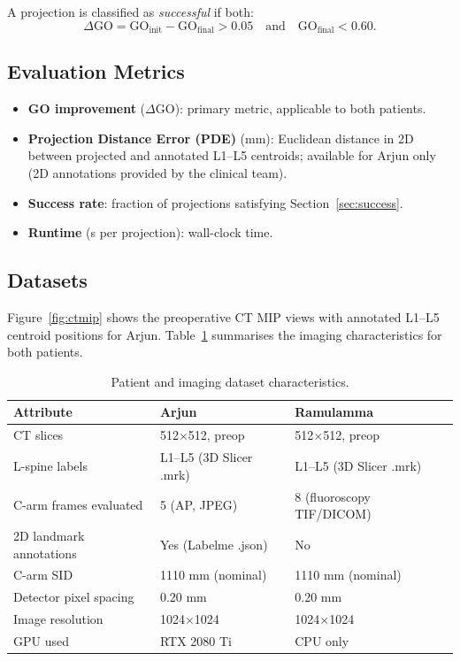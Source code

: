 \documentclass[10pt,a4paper]{article}
\begin{document}
A projection is classified as \emph{successful} if both:
\[
  \Delta\mathrm{GO} = \mathrm{GO}_\mathrm{init} -
                      \mathrm{GO}_\mathrm{final} > 0.05
  \quad \text{and} \quad
  \mathrm{GO}_\mathrm{final} < 0.60.
\]

\subsection{Evaluation Metrics}
\label{sec:metrics}

\begin{itemize}
  \item \textbf{GO improvement} ($\Delta\mathrm{GO}$): primary metric,
        applicable to both patients.
  \item \textbf{Projection Distance Error (PDE)} (mm): Euclidean
        distance in 2D between projected and annotated L1--L5 centroids;
        available for Arjun only (2D annotations provided by
        the clinical team).
  \item \textbf{Success rate}: fraction of projections satisfying
        Section~\ref{sec:success}.
  \item \textbf{Runtime} (s per projection): wall-clock time.
\end{itemize}

\subsection{Datasets}
\label{sec:data}

Figure~\ref{fig:ctmip} shows the preoperative CT MIP views with annotated
L1--L5 centroid positions for Arjun.
Table~\ref{tab:data} summarises the imaging characteristics for both patients.

\begin{table}[H]
\centering
\caption{Patient and imaging dataset characteristics.}
\label{tab:data}
\begin{tabular}{lll}
\toprule
\textbf{Attribute}               & \textbf{Arjun}           & \textbf{Ramulamma} \\
\midrule
CT slices                        & 512$\times$512, preop     & 512$\times$512, preop \\
L-spine labels                   & L1--L5 (3D Slicer .mrk)  & L1--L5 (3D Slicer .mrk) \\
C-arm frames evaluated           & 5 (AP, JPEG)              & 8 (fluoroscopy TIF/DICOM) \\
2D landmark annotations          & Yes (Labelme .json)       & No \\
C-arm SID                        & 1110 mm (nominal)         & 1110 mm (nominal) \\
Detector pixel spacing           & 0.20 mm                   & 0.20 mm \\
Image resolution                 & 1024$\times$1024          & 1024$\times$1024 \\
GPU used                         & RTX 2080 Ti               & CPU only \\
\bottomrule
\end{tabular}
\end{table}
\end{document}
